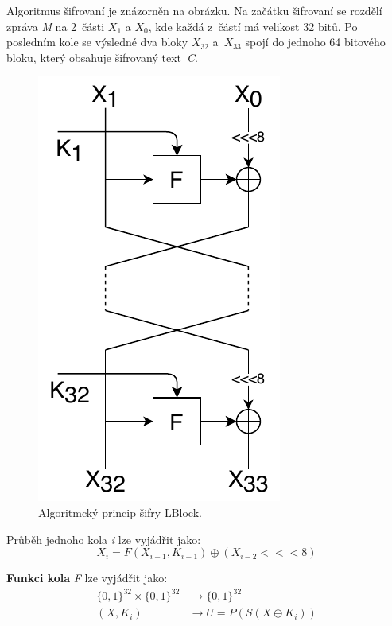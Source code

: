 Algoritmus šifrovaní je znázorněn na obrázku. Na začátku šifrovaní se rozdělí zpráva \textit{M} na 2~části $X_1$ a $X_0$, kde každá z~částí má velikost 32 bitů. Po posledním kole se výsledné dva bloky $X_{32}$ a~$X_{33}$ spojí do jednoho 64 bitového bloku, který obsahuje šifrovaný text~\textit{C}.\cite{LBlock}
\begin{figure}[!h]
  \begin{center}
    \includegraphics[scale=1]{obrazky/LBlock.pdf}
  \end{center}
  \caption[Algoritmcký princip šifry LBlock]{Algoritmcký princip šifry LBlock.\cite{LBlock}}
  \label{img:Lblock}
\end{figure}

\noindent Průběh jednoho kola \textit{i} lze vyjádřit jako:
\[X_i = F(X_{i-1}, K_{i-1})\oplus (X_{i-2}<<<8)\]

\noindent \textbf{Funkci kola} \textit{F} lze vyjádřit jako:
\begin{align*}
    \{0,1\}^{32} \times \{0,1\}^{32} & \longrightarrow \{0,1\}^{32}\\
    (X, K_i) & \longrightarrow U = P(S(X \oplus K_i))
\end{align*}

